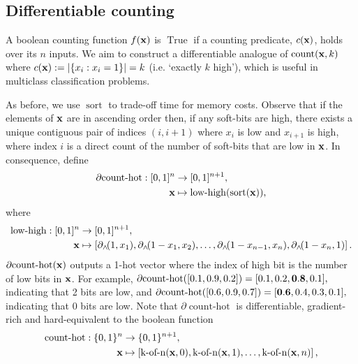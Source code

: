 \documentclass{article} %
\begin{document}
\subsection{Differentiable counting}

A boolean counting function $f({\bf x})$ is $\operatorname{True}$ if a counting predicate, $c({\bf x})$, holds over its $n$ inputs. We aim to construct a differentiable analogue of $\operatorname{count}({\bf x}, k)$ where $c({\bf x}) := |\{x_{i} : x_{i} = 1 \}| = k$ (i.e. `exactly $k$ high'), which is useful in multiclass classification problems.

As before, we use $\operatorname{sort}$ to trade-off time for memory costs. Observe that if the elements of ${\bf x}$ are in ascending order then, if any soft-bits are high, there exists a unique contiguous pair of indices $(i,i+1)$ where $x_{i}$ is low and $x_{i+1}$ is high, where index $i$ is a direct count of the number of soft-bits that are low in ${\bf x}$. In consequence, define
\begin{equation*}
\begin{aligned}
\partial\!\operatorname{count-hot}: [0,1]^{n} &\to [0,1]^{n+1}, \\
{\bf x} &\mapsto \operatorname{low-high}(\operatorname{sort}({\bf x}))\text{,}
\end{aligned}
\end{equation*}
where 
\begin{equation*}
\begin{aligned}
\operatorname{low-high}: [0,1]^{n} &\to [0,1]^{n+1},\\
{\bf x} &\mapsto \left[ \partial_{\wedge}\!(1, x_{1}), \partial_{\wedge}\!(1 - x_{1}, x_{2}), \dots, \partial_{\wedge}\!(1 - x_{n-1}, x_{n}), \partial_{\wedge}\!(1-x_{n}, 1) \right]\text{.}
\end{aligned}
\end{equation*}
$\partial\!\operatorname{count-hot}({\bf x})$ outputs a 1-hot vector where the index of high bit is the number of low bits in ${\bf x}$. For example, $\partial\!\operatorname{count-hot}([0.1, 0.9, 0.2]) = [0.1, 0.2, \bold{0.8}, 0.1]\text{,}$ indicating that 2 bits are low, and $\partial\!\operatorname{count-hot}([0.6, 0.9, 0.7]) = [\bold{0.6}, 0.4, 0.3, 0.1]\text{,}$ indicating that 0 bits are low. Note that $\partial\!\operatorname{count-hot}$ is differentiable, gradient-rich and hard-equivalent to the boolean function
\begin{equation*}
\begin{aligned}
\operatorname{count-hot}: \{0,1\}^{n} &\to \{0,1\}^{n+1}, \\
{\bf x} &\mapsto \left[\operatorname{k-of-n}({\bf x}, 0), \operatorname{k-of-n}({\bf x}, 1), \dots, \operatorname{k-of-n}({\bf x}, n)\right]\text{,}
\end{aligned}
\end{equation*}
\end{document}
